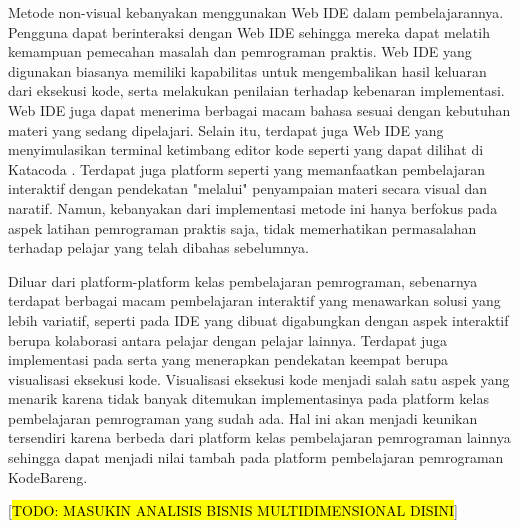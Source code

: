 Metode non-visual kebanyakan menggunakan Web IDE dalam pembelajarannya. Pengguna dapat berinteraksi dengan Web IDE sehingga mereka dapat melatih kemampuan pemecahan masalah dan pemrograman praktis. Web IDE yang digunakan biasanya memiliki kapabilitas untuk mengembalikan hasil keluaran dari eksekusi kode, serta melakukan penilaian terhadap kebenaran implementasi. Web IDE juga dapat menerima berbagai macam bahasa sesuai dengan kebutuhan materi yang sedang dipelajari. Selain itu, terdapat juga Web IDE yang menyimulasikan terminal ketimbang editor kode seperti yang dapat dilihat di Katacoda \parencite{katacoda2021media}. Terdapat juga platform seperti \textcite{progate2021media} yang memanfaatkan pembelajaran interaktif dengan pendekatan "melalui" penyampaian materi secara visual dan naratif. Namun, kebanyakan dari implementasi metode ini hanya berfokus pada aspek latihan pemrograman praktis saja, tidak memerhatikan permasalahan terhadap pelajar yang telah dibahas sebelumnya.

Diluar dari platform-platform kelas pembelajaran pemrograman, sebenarnya terdapat berbagai macam pembelajaran interaktif yang menawarkan solusi yang lebih variatif, seperti pada \textcite{tran2013interactive} IDE yang dibuat digabungkan dengan aspek interaktif berupa kolaborasi antara pelajar dengan pelajar lainnya. Terdapat juga implementasi pada \textcite{guo2013pythontutor} serta \textcite{moons2013pilot} yang menerapkan pendekatan keempat berupa visualisasi eksekusi kode. Visualisasi eksekusi kode menjadi salah satu aspek yang menarik karena tidak banyak ditemukan implementasinya pada platform kelas pembelajaran pemrograman yang sudah ada. Hal ini akan menjadi keunikan tersendiri karena berbeda dari platform kelas pembelajaran pemrograman lainnya sehingga dapat menjadi nilai tambah pada platform pembelajaran pemrograman KodeBareng.

  [\hl{TODO: MASUKIN ANALISIS BISNIS MULTIDIMENSIONAL DISINI}]


